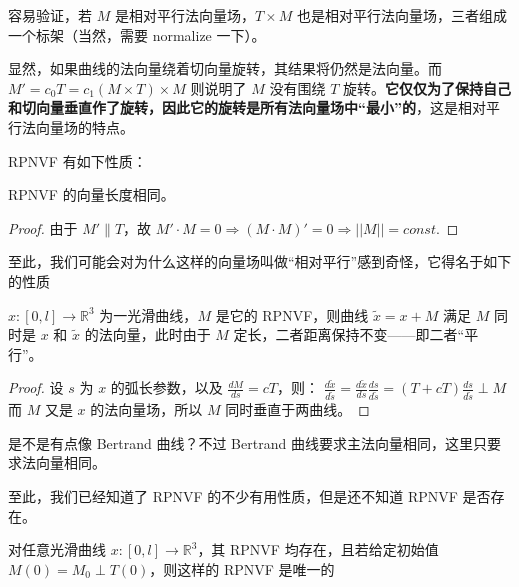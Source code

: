 \documentclass{notes}
\begin{document}
容易验证，若 $M$ 是相对平行法向量场，$T \times M$ 也是相对平行法向量场，三者组成一个标架（当然，需要 normalize 一下）。

显然，如果曲线的法向量绕着切向量旋转，其结果将仍然是法向量。而 $M' = c_0T = c_1 (M \times T) \times M$ 则说明了 $M$ 没有围绕 $T$ 旋转。\textbf{它仅仅为了保持自己和切向量垂直作了旋转，因此它的旋转是所有法向量场中“最小”的}，这是相对平行法向量场的特点。

RPNVF 有如下性质：

\begin{proposition}
	RPNVF 的向量长度相同。
\end{proposition}

\begin{proof}
	由于 $M' \parallel T$，故 $M' \cdot M = 0 \Rightarrow (M \cdot M)' = 0 \Rightarrow || M || = const.$
\end{proof}

至此，我们可能会对为什么这样的向量场叫做“相对平行”感到奇怪，它得名于如下的性质

\begin{proposition}
	$x: [0, l] \rightarrow \mathbb{R}^3$ 为一光滑曲线，$M$ 是它的 RPNVF，则曲线 $\tilde{x} = x + M$ 满足 $M$ 同时是 $x$ 和 $\tilde{x}$ 的法向量，此时由于 $M$ 定长，二者距离保持不变——即二者“平行”。
\end{proposition}

\begin{proof}
	设 $s$ 为 $x$ 的弧长参数，以及 $\frac{dM}{ds} = cT$，则：
	$\frac{d\tilde{x}}{d\tilde{s}} = \frac{d \tilde{x}}{d s} \frac{ds}{d \tilde{s}} = (T + cT) \frac{ds}{d\tilde{s}} \perp M$
	而 $M$ 又是 $x$ 的法向量场，所以 $M$ 同时垂直于两曲线。
\end{proof}

\begin{remark}
	是不是有点像 Bertrand 曲线？不过 Bertrand 曲线要求主法向量相同，这里只要求法向量相同。
\end{remark}

至此，我们已经知道了 RPNVF 的不少有用性质，但是还不知道 RPNVF 是否存在。

\begin{theorem}
	对任意光滑曲线 $x: [0, l] \rightarrow \mathbb{R}^3$，其 RPNVF 均存在，且若给定初始值 $M(0) = M_0 \perp T(0)$，则这样的 RPNVF 是唯一的
\end{theorem}
\end{document}
